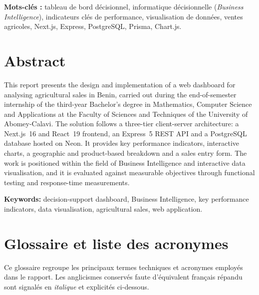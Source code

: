 \documentclass[11pt,a4paper]{report}
\begin{document}
\vspace{0.4cm}
\noindent\textbf{Mots-clés :} tableau de bord décisionnel, informatique
décisionnelle (\emph{Business Intelligence}), indicateurs clés de performance,
visualisation de données, ventes agricoles, Next.js, Express, PostgreSQL,
Prisma, Chart.js.

\chapter*{Abstract}

This report presents the design and implementation of a web dashboard for
analysing agricultural sales in Benin, carried out during the end-of-semester
internship of the third-year Bachelor's degree in Mathematics, Computer Science
and Applications at the Faculty of Sciences and Techniques of the University of
Abomey-Calavi. The solution follows a three-tier client-server architecture: a
Next.js~16 and React~19 frontend, an Express~5 REST API and a PostgreSQL
database hosted on Neon. It provides key performance indicators, interactive
charts, a geographic and product-based breakdown and a sales entry form. The
work is positioned within the field of Business Intelligence and interactive
data visualisation, and it is evaluated against measurable objectives through
functional testing and response-time measurements.

\vspace{0.4cm}
\noindent\textbf{Keywords:} decision-support dashboard, Business Intelligence,
key performance indicators, data visualisation, agricultural sales, web
application.

\chapter*{Glossaire et liste des acronymes}

Ce glossaire regroupe les principaux termes techniques et acronymes employés
dans le rapport. Les anglicismes conservés faute d'équivalent français répandu
sont signalés en \emph{italique} et explicités ci-dessous.
\end{document}
